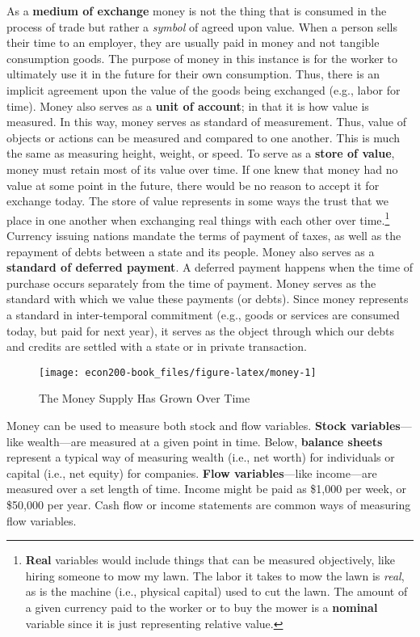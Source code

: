 \documentclass[
]{book}
\begin{document}
As a \textbf{medium of exchange} money is not the thing that is consumed in the process of trade but rather a \emph{symbol} of agreed upon value. When a person sells their time to an employer, they are usually paid in money and not tangible consumption goods. The purpose of money in this instance is for the worker to ultimately use it in the future for their own consumption. Thus, there is an implicit agreement upon the value of the goods being exchanged (e.g., labor for time). Money also serves as a \textbf{unit of account}; in that it is how value is measured. In this way, money serves as standard of measurement. Thus, value of objects or actions can be measured and compared to one another. This is much the same as measuring height, weight, or speed. To serve as a \textbf{store of value}, money must retain most of its value over time. If one knew that money had no value at some point in the future, there would be no reason to accept it for exchange today. The store of value represents in some ways the trust that we place in one another when exchanging real things with each other over time.\footnote{\textbf{Real} variables would include things that can be measured objectively, like hiring someone to mow my lawn. The labor it takes to mow the lawn is \emph{real}, as is the machine (i.e., physical capital) used to cut the lawn. The amount of a given currency paid to the worker or to buy the mower is a \textbf{nominal} variable since it is just representing relative value.} Currency issuing nations mandate the terms of payment of taxes, as well as the repayment of debts between a state and its people. Money also serves as a \textbf{standard of deferred payment}. A deferred payment happens when the time of purchase occurs separately from the time of payment. Money serves as the standard with which we value these payments (or debts). Since money represents a standard in inter-temporal commitment (e.g., goods or services are consumed today, but paid for next year), it serves as the object through which our debts and credits are settled with a state or in private transaction.

\begin{figure}

{\centering \texttt{[image: econ200-book\_files/figure-latex/money-1]} 

}

\caption{The Money Supply Has Grown Over Time}\label{fig:money}
\end{figure}

Money can be used to measure both stock and flow variables. \textbf{Stock variables}---like wealth---are measured at a given point in time. Below, \textbf{balance sheets} represent a typical way of measuring wealth (i.e., net worth) for individuals or capital (i.e., net equity) for companies. \textbf{Flow variables}---like income---are measured over a set length of time. Income might be paid as \$1,000 per week, or \$50,000 per year. Cash flow or income statements are common ways of measuring flow variables.
\end{document}
